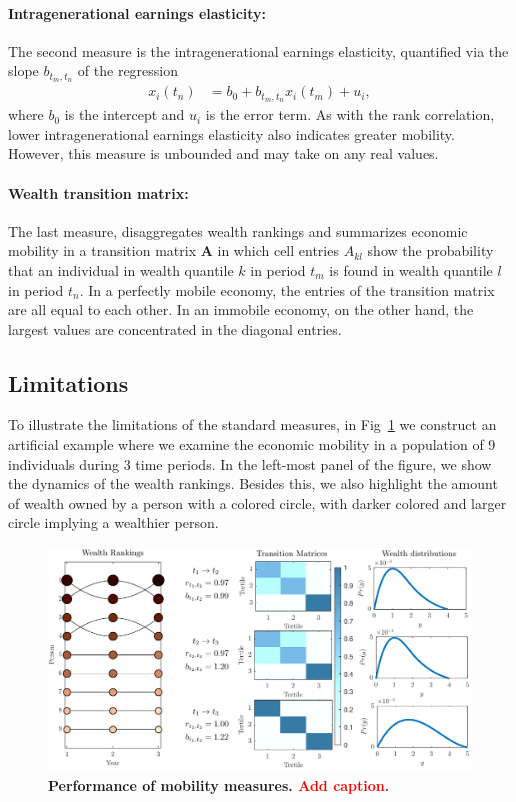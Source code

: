 \documentclass[11pt]{article}
\numberwithin{equation}{section}
\begin{document}
\paragraph{Intragenerational earnings elasticity:} The second measure is the intragenerational earnings elasticity, quantified via the slope $b_{t_m,t_n}$ of the regression
\begin{align*}
    x_i(t_n) &= b_0 + b_{t_m,t_n} x_i(t_m) + u_i,
\end{align*}
where $b_0$ is the intercept and $u_i$ is the error term. As with the rank correlation, lower intragenerational earnings elasticity also indicates greater mobility. However, this measure is unbounded and may take on any real values.

\paragraph{Wealth transition matrix:} The last measure, disaggregates wealth rankings and summarizes economic mobility in a
transition matrix $\mathbf{A}$ in which cell entries $A_{kl}$ show the probability that an individual in wealth quantile $k$ in period $t_m$ is found in wealth quantile $l$ in period $t_n$. In a perfectly mobile economy, the entries of the transition matrix are all equal to each other. In an immobile economy, on the other hand, the largest values are concentrated in the diagonal entries.

\subsection{Limitations}

To illustrate the limitations of the standard measures, in Fig~\ref{fig:standard-mobility-measures} we construct an artificial example where we examine the economic mobility in a population of 9 individuals during 3 time periods. In the left-most panel of the figure, we show the dynamics of the wealth rankings. Besides this, we also highlight the amount of wealth owned by a person with a colored circle, with darker colored and larger circle implying a wealthier person. 
\begin{figure}[t!]
\includegraphics[width=\linewidth]{figs/fig_mobility_measures.pdf}
\caption{\textbf{Performance of mobility measures. \textcolor{red}{Add caption.}} \label{fig:standard-mobility-measures}}
\end{figure}
\end{document}
